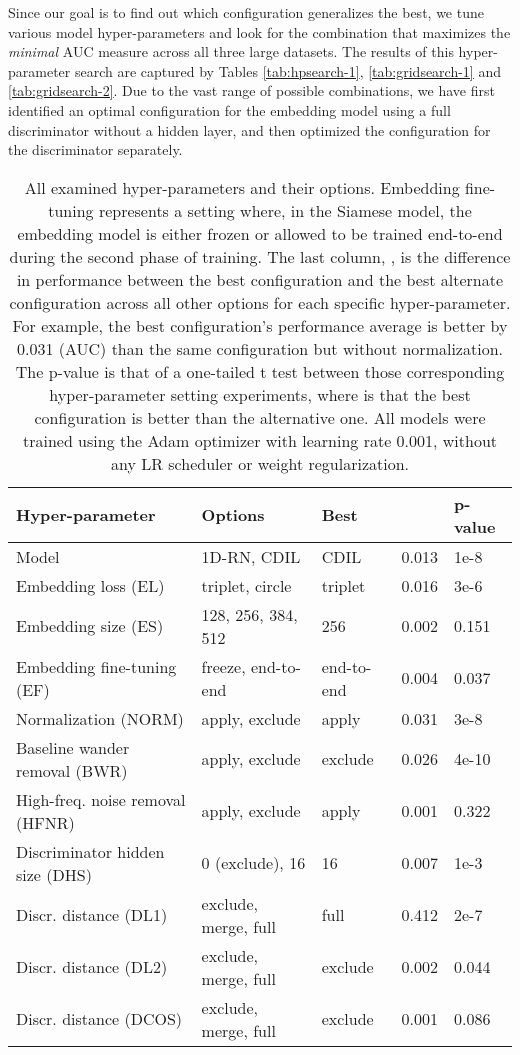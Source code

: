 \documentclass[preprint,12pt]{elsarticle}
\begin{document}
Since our goal is to find out which configuration generalizes the best, we tune various model hyper-parameters and look for the combination that maximizes the \textit{minimal} AUC measure across all three large datasets. The results of this hyper-parameter search are captured by Tables \ref{tab:hpsearch-1},  \ref{tab:gridsearch-1} and \ref{tab:gridsearch-2}. Due to the vast range of possible combinations, we have first identified an optimal configuration for the embedding model using a full discriminator without a hidden layer, and then optimized the configuration for the discriminator separately.

\begin{landscape}

\begin{table}
    \centering
    \begin{tabular}{lllll}
        \toprule
        \textbf{Hyper-parameter} & \textbf{Options} & \textbf{Best} & \textbf{} & \textbf{p-value}\\
        \midrule
        Model & 1D-RN, CDIL & CDIL & 0.013 & 1e-8 \\ 
        Embedding loss (EL) & triplet, circle & triplet & 0.016 & 3e-6 \\
        Embedding size (ES) & 128, 256, 384, 512 & 256 & 0.002 & 0.151 \\ 
        Embedding fine-tuning (EF) & freeze, end-to-end & end-to-end & 0.004 & 0.037 \\
        Normalization (NORM) & apply, exclude & apply & 0.031 & 3e-8\\ 
        Baseline wander removal (BWR) & apply, exclude & exclude & 0.026 & 4e-10\\
        High-freq. noise removal (HFNR) & apply, exclude & apply & 0.001 & 0.322\\
        \midrule
        Discriminator hidden size (DHS) & 0 (exclude), 16 & 16 & 0.007 & 1e-3\\
        Discr.  distance (DL1) & exclude, merge, full & full & 0.412 & 2e-7\\
        Discr.  distance (DL2) & exclude, merge, full & exclude & 0.002 & 0.044 \\
        Discr.  distance (DCOS) & exclude, merge, full & exclude & 0.001 & 0.086 \\
        \bottomrule
    \end{tabular}
    \caption{All examined hyper-parameters and their options. Embedding fine-tuning represents a setting where, in the Siamese model, the embedding model is either frozen or allowed to be trained end-to-end during the second phase of training. The last column, , is the difference in performance between the best configuration and the best alternate configuration across all other options for each specific hyper-parameter. For example, the best configuration's performance average is better by 0.031 (AUC) than the same configuration but without normalization. The p-value is that of a one-tailed t test between those corresponding hyper-parameter setting experiments, where  is that the best configuration is better than the alternative one. All models were trained using the Adam optimizer with learning rate 0.001, without any LR scheduler or weight regularization.}

\end{table}
\end{landscape}
\end{document}
